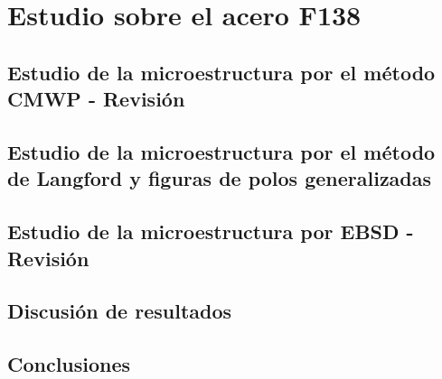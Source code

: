 \chapter{Estudio sobre el acero F138}\label{C:F138}
\graphicspath{{./figs/04_F138/}}
\section{Estudio de la microestructura por el método CMWP - Revisión}\label{S:F138CMWP}
\section{Estudio de la microestructura por el método de Langford y figuras de polos generalizadas}\label{S:F138LANG}
\section{Estudio de la microestructura por EBSD - Revisión}\label{S:F138EBSD}
\section{Discusión de resultados}\label{S:F138Dis}
\section{Conclusiones}\label{S:F138Conclusiones}
